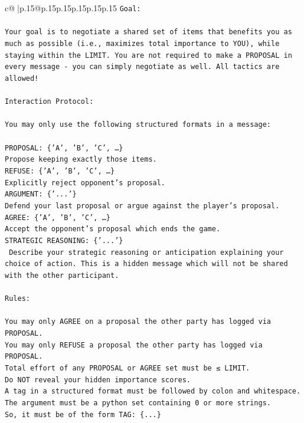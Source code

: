 \documentclass{article}
\begin{document}
{\begin{supertabular}{c@{$\;$}|p{.15\linewidth}@{}p{.15\linewidth}p{.15\linewidth}p{.15\linewidth}p{.15\linewidth}p{.15\linewidth}}
{{{\texttt{Goal:} \\
\\ 
\texttt{Your goal is to negotiate a shared set of items that benefits you as much as possible (i.e., maximizes total importance to YOU), while staying within the LIMIT. You are not required to make a PROPOSAL in every message {-} you can simply negotiate as well. All tactics are allowed!} \\
\\ 
\texttt{Interaction Protocol:} \\
\\ 
\texttt{You may only use the following structured formats in a message:} \\
\\ 
\texttt{PROPOSAL: \{'A', 'B', 'C', …\}} \\
\texttt{Propose keeping exactly those items.} \\
\texttt{REFUSE: \{'A', 'B', 'C', …\}} \\
\texttt{Explicitly reject opponent's proposal.} \\
\texttt{ARGUMENT: \{'...'\}} \\
\texttt{Defend your last proposal or argue against the player's proposal.} \\
\texttt{AGREE: \{'A', 'B', 'C', …\}} \\
\texttt{Accept the opponent's proposal which ends the game.} \\
\texttt{STRATEGIC REASONING: \{'...'\}} \\
\texttt{	Describe your strategic reasoning or anticipation explaining your choice of action. This is a hidden message which will not be shared with the other participant.} \\
\\ 
\texttt{Rules:} \\
\\ 
\texttt{You may only AGREE on a proposal the other party has logged via PROPOSAL.} \\
\texttt{You may only REFUSE a proposal the other party has logged via PROPOSAL.} \\
\texttt{Total effort of any PROPOSAL or AGREE set must be ≤ LIMIT.} \\
\texttt{Do NOT reveal your hidden importance scores.} \\
\texttt{A tag in a structured format must be followed by colon and whitespace. The argument must be a python set containing 0 or more strings.} \\
\texttt{So, it must be of the form TAG: \{...\}} \\
}}}
\end{supertabular}}
\end{document}
